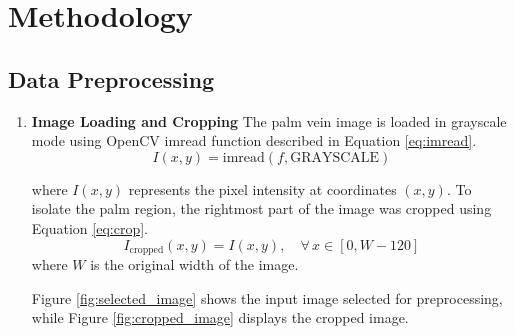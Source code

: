 \section{Methodology}


\subsection{Data Preprocessing}

\begin{enumerate}
    \item \textbf{Image Loading and Cropping}
    The palm vein image is loaded in grayscale mode using OpenCV imread function described in Equation \ref{eq:imread}. 
    \begin{equation}
        I(x, y) = \text{imread}(f, \text{GRAYSCALE})
        \label{eq:imread}
    \end{equation}

    where \( I(x, y) \) represents the pixel intensity at coordinates \( (x, y) \). 
    To isolate the palm region, the rightmost part of the image was cropped using Equation \ref{eq:crop}.
    \begin{equation}
        I_{\text{cropped}}(x, y) = I(x, y), \quad \forall \, x \in [0, W-120]
        \label{eq:crop}
    \end{equation} 
    where \( W \) is the original width of the image.
   
    Figure \ref{fig:selected_image} shows the input image selected for preprocessing, while Figure \ref{fig:cropped_image} displays the cropped image.

    \newpage


\end{enumerate}
